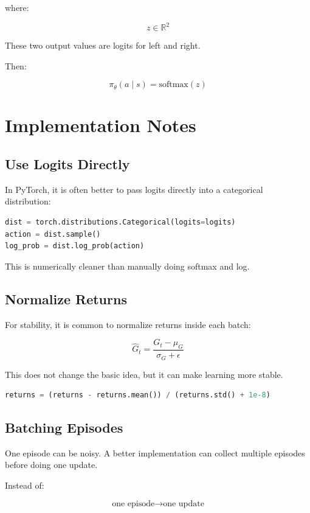 \documentclass[11pt]{article}
\begin{document}
where:

\[
 z \in \mathbb{R}^2
\]

These two output values are logits for left and right.

Then:

\[
\pi_\theta(a \mid s) = \text{softmax}(z)
\]

\section{Implementation Notes}

\subsection{Use Logits Directly}

In PyTorch, it is often better to pass logits directly into a categorical distribution:

\begin{lstlisting}[language=Python]
dist = torch.distributions.Categorical(logits=logits)
action = dist.sample()
log_prob = dist.log_prob(action)
\end{lstlisting}

This is numerically cleaner than manually doing softmax and log.

\subsection{Normalize Returns}

For stability, it is common to normalize returns inside each batch:

\[
\hat{G}_t = \frac{G_t - \mu_G}{\sigma_G + \epsilon}
\]

This does not change the basic idea, but it can make learning more stable.

\begin{lstlisting}[language=Python]
returns = (returns - returns.mean()) / (returns.std() + 1e-8)
\end{lstlisting}

\subsection{Batching Episodes}

One episode can be noisy.
A better implementation can collect multiple episodes before doing one update.

Instead of:

\[
\text{one episode} \rightarrow \text{one update}
\]
\end{document}
